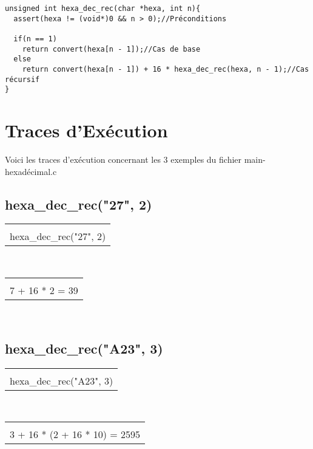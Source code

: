 \documentclass[a4paper, 11pt, oneside]{article}
\begin{document}
\begin{lstlisting}
unsigned int hexa_dec_rec(char *hexa, int n){
  assert(hexa != (void*)0 && n > 0);//Préconditions

  if(n == 1)
    return convert(hexa[n - 1]);//Cas de base
  else
    return convert(hexa[n - 1]) + 16 * hexa_dec_rec(hexa, n - 1);//Cas récursif
}
\end{lstlisting}
\newpage
\section{Traces d'Exécution}\label{traces}
%
%


Voici les traces d'exécution concernant les 3 exemples du fichier main-hexadécimal.c

\subsection{hexa\_dec\_rec("27", 2)}

 \begin{tabular}{|c|}
 \\
 \\
 hexa\_dec\_rec("27", 2)\\
 \hline
 \end{tabular}~~
 \begin{tabular}{|c|}
 \\
 \\
 7 + 16 * 2 = 39\\
 \hline
 \end{tabular}~~
 
\subsection{hexa\_dec\_rec("A23", 3)}

 \begin{tabular}{|c|}
 \\
 \\
 hexa\_dec\_rec("A23", 3)\\
 \hline
 \end{tabular}~~
 \begin{tabular}{|c|}
 \\
 \\
 3 + 16 * (2 + 16 * 10) = 2595\\
 \hline
 \end{tabular}~~
 
\end{document}
